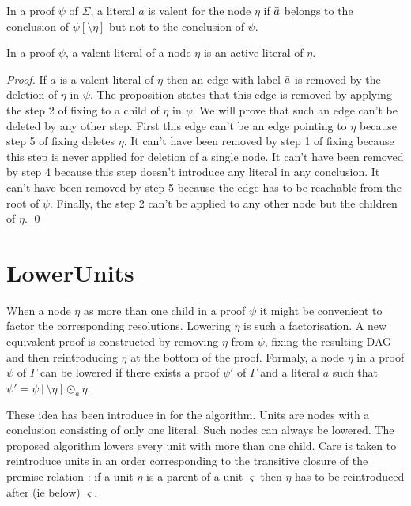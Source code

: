 \documentclass{llncs}
\begin{document}
\begin{definition}
In a proof $\psi$ of $\Sigma$, a literal $a$ is valent for the node $\eta$ if $\bar{a}$ belongs to
the conclusion of $\psi[\setminus \eta]$ but not to the conclusion of $\psi$.
\end{definition}

\begin{proposition}
In a proof $\psi$, a valent literal of a node $\eta$ is an active literal of $\eta$.
\end{proposition}

\begin{proof}
If $a$ is a valent literal of $\eta$ then an edge with label $\bar{a}$ is removed by the deletion of
$\eta$ in $\psi$. The proposition states that this edge is removed by applying the step 2 of fixing
to a child of $\eta$ in $\psi$. We will prove that such an edge can't be deleted by any other step.
First this edge can't be an edge pointing to $\eta$ because step 5 of fixing deletes $\eta$.
It can't have been removed by step 1 of fixing because this step is never applied for deletion of a
single node.
It can't have been removed by step 4 because this step doesn't introduce any literal in any conclusion.
It can't have been removed by step 5 because the edge has to be reachable from the root of $\psi$.
Finally, the step 2 can't be applied to any other node but the children
of $\eta$. \qed
\end{proof}



\section{LowerUnits}

When a node $\eta$ as more than one child in a proof $\psi$ it might be convenient to factor the
corresponding resolutions. Lowering $\eta$ is such a factorisation. A new equivalent proof is
constructed by removing $\eta$ from $\psi$, fixing the resulting DAG and then reintroducing $\eta$
at the bottom of the proof. Formaly, a node $\eta$ in a proof $\psi$ of $\Gamma$ can be lowered if
there exists a proof $\psi'$ of $\Gamma$ and a literal $a$ such that $\psi' = \psi[\setminus \eta]
\odot_a \eta$.

These idea has been introduce in \cite{LURPI} for the {\LowerUnits} algorithm. Units are nodes with a
conclusion consisting of only one literal. Such nodes can always be lowered. The proposed algorithm
lowers every unit with more than one child. Care is taken to reintroduce units in an order
corresponding to the transitive closure of the premise relation : if a unit $\eta$ is a parent of a
unit $\varsigma$ then $\eta$ has to be reintroduced after (ie below) $\varsigma$.
\end{document}
